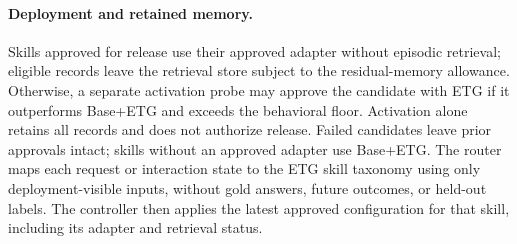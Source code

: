 \paragraph{Deployment and retained memory.}
\label{sec:commit}
Skills approved for release use their approved adapter
without episodic retrieval; eligible records leave the
retrieval store subject to the residual-memory allowance.
Otherwise, a separate activation probe may approve the
candidate with ETG if it outperforms Base+ETG and exceeds
the behavioral floor. Activation alone retains all records
and does not authorize release.
Failed candidates leave prior approvals intact; skills
without an approved adapter use Base+ETG. The router maps each request or interaction state to the ETG skill taxonomy using only deployment-visible inputs,
without gold answers, future outcomes, or held-out labels.
The controller then applies the latest approved
configuration for that skill, including its adapter
and retrieval status.
